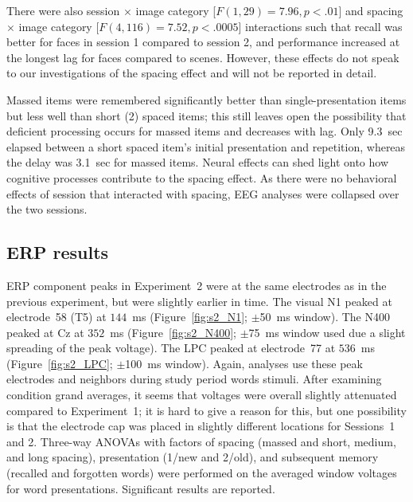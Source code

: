 There were also session $\times$ image category [$F(1,29)=7.96, p<.01$] and spacing $\times$ image category [$F(4,116)=7.52, p<.0005$] interactions such that recall was better for faces in session 1 compared to session 2, and performance increased at the longest lag for faces compared to scenes.  However, these effects do not speak to our investigations of the spacing effect and will not be reported in detail.

Massed items were remembered significantly better than single-presentation items but less well than short (2) spaced items; this still leaves open the possibility that deficient processing occurs for massed items and decreases with lag.  Only 9.3~sec elapsed between a short spaced item's initial presentation and repetition, whereas the delay was 3.1~sec for massed items.  Neural effects can shed light onto how cognitive processes contribute to the spacing effect.  As there were no behavioral effects of session that interacted with spacing, EEG analyses were collapsed over the two sessions.

\subsection{ERP results}

ERP component peaks in Experiment~2 were at the same electrodes as in the previous experiment, but were slightly earlier in time.
The visual N1 peaked at electrode~58 (T5) at $144$~ms (Figure~\ref{fig:s2_N1}; $\pm$50~ms window).  The N400 peaked at Cz at $352$~ms (Figure~\ref{fig:s2_N400}; $\pm$75~ms window used due a slight spreading of the peak voltage).  The LPC peaked at electrode~77 at $536$~ms (Figure~\ref{fig:s2_LPC}; $\pm$100~ms window).  Again, analyses use these peak electrodes and neighbors during study period words stimuli.  After examining condition grand averages, it seems that voltages were overall slightly attenuated compared to Experiment~1; it is hard to give a reason for this, but one possibility is that the electrode cap was placed in slightly different locations for Sessions~1 and 2.
Three-way ANOVAs with factors of spacing (massed and short, medium, and long spacing), presentation (1/new and 2/old), and subsequent memory (recalled and forgotten words) were performed on the averaged window voltages for word presentations.  Significant results are reported.

